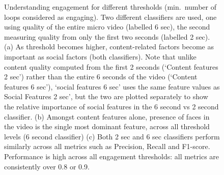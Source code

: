 \begin{figure}[!htbp]
\centering
\hspace*{-5mm}
\caption{ Understanding engagement for different thresholds (min.\ number of loops considered as engaging). Two different classifiers are used, one using quality of the entire micro video (labelled 6 sec), the second measuring quality from only the first two seconds (labelled 2 sec). (a) As threshold becomes higher, content-related factors become as important as social factors (both classifiers). Note that unlike content quality computed from the first 2 seconds (`Content features 2 sec') rather than the entire 6 seconds of the video (`Content features 6 sec'), `social features 6 sec' uses the same feature values as Social Features 2 sec', but the two are plotted separately to show the relative  importance of social features in the 6 second vs 2 second classifier. (b) Amongst content features alone, presence of faces in the video is the single most dominant feature, across all threshold levels (6 second classifier) (c) Both 2 sec and 6 sec classifiers perform similarly across all metrics such as Precision, Recall and F1-score. Performance is high across all engagement thresholds: all metrics are consistently over 0.8 or 0.9.}
\label{fig:classifier}
\end{figure}


